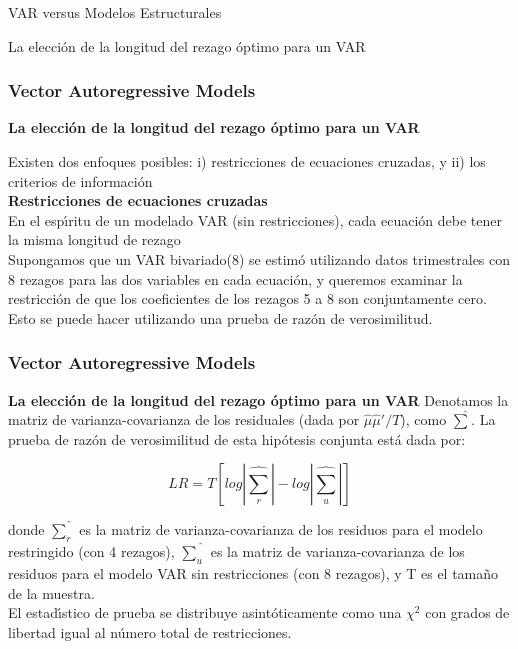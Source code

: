 \documentclass[spanish,xcolor=table]{beamer}
\begin{document}
\begin{section}{VAR versus Modelos Estructurales}
\begin{frame}
\end{frame}
\end{section}
\begin{section}{La elecci\'on de la longitud del rezago \'optimo para un VAR}
\begin{frame}
\frametitle{Vector Autoregressive Models}
\textbf{La elecci\'on de la longitud del rezago \'optimo para un VAR}

Existen dos enfoques posibles: i) restricciones de ecuaciones cruzadas, y ii) los criterios de informaci\'on\\

\textbf{Restricciones de ecuaciones cruzadas}\\
En el esp\'{\i}ritu de un modelado VAR (sin restricciones), cada ecuaci\'on debe tener la misma longitud de rezago\\
Supongamos que un VAR bivariado(8) se estim\'o utilizando datos trimestrales con 8 rezagos para las dos variables en cada ecuaci\'on, y queremos examinar la restricci\'on de que los coeficientes de los rezagos 5 a 8 son conjuntamente cero. Esto se puede hacer utilizando una prueba de raz\'on de verosimilitud.\\

\end{frame}
\begin{frame}
\frametitle{Vector Autoregressive Models}
\textbf{La elecci\'on de la longitud del rezago \'optimo para un VAR}
Denotamos la matriz de varianza-covarianza de los residuales (dada por $\hat{\mu}\hat{\mu}' /T$), como $\hat{\sum}$. La prueba de raz\'on de verosimilitud de esta hip\'otesis conjunta está dada por:

\begin{equation*}
LR = T\left [ log |\hat{\sum_r}| - log |\hat{\sum_u}| \right ]
\end{equation*}

donde $\hat{\sum_r}$ es la matriz de varianza-covarianza de los residuos para el modelo restringido (con 4 rezagos), $\hat{\sum_u}$ es la matriz de varianza-covarianza de los residuos para el modelo VAR sin restricciones (con 8 rezagos), y T es el tama\~no de la muestra.\\
El estad\'{\i}stico de prueba se distribuye asint\'oticamente como una $\chi^2$ con grados de libertad igual al n\'umero total de restricciones. 


\end{frame}
\end{section}
\end{document}
